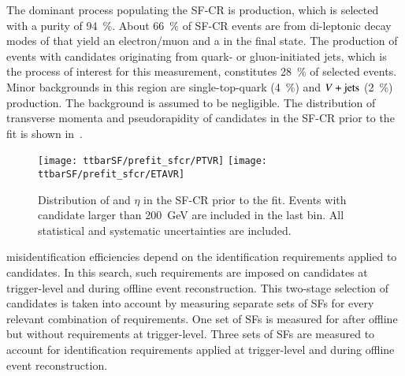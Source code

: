 The dominant process populating the SF-CR is \ttbar production, which is
selected with a purity of \SI{94}{\percent}. About \SI{66}{\percent} of SF-CR
events are from di-leptonic decay modes of \ttbar that yield an electron/muon
and a \tauhadvis in the final state. The production of \ttbar events with
\tauhadvis candidates originating from quark- or gluon-initiated jets, which is
the process of interest for this measurement, constitutes \SI{28}{\percent} of
selected events. Minor backgrounds in this region are single-top-quark
(\SI{4}{\percent}) and $V+\text{jets}$ (\SI{2}{\percent}) production. The \multijet
background is assumed to be negligible. The distribution of transverse momenta
and pseudorapidity of \tauhadvis candidates in the SF-CR prior to the fit is
shown in~.

\begin{figure}[htbp]
  \centering

  \texttt{[image: ttbarSF/prefit\_sfcr/PTVR]}%
  \texttt{[image: ttbarSF/prefit\_sfcr/ETAVR]}

  \caption[Distribution of \tauhadvis \pT and $\eta$ in the SF-CR.]{Distribution
    of \tauhadvis \pT and $\eta$ in the SF-CR prior to the fit. Events with
    \tauhadvis candidate \pT larger than \SI{200}{\GeV} are included in the last
    bin. All statistical and systematic uncertainties are included.}%
  \label{fig:ttbarSF_prefit_pt}
\end{figure}

\Jettotauhadvis misidentification efficiencies depend on the identification
requirements applied to \tauhadvis candidates. In this search, such requirements
are imposed on \tauhadvis candidates at trigger-level and during offline event
reconstruction. This two-stage selection of \tauhadvis candidates is taken into
account by measuring separate sets of SFs for every relevant combination of
\tauid requirements. One set of SFs is measured for \faketauhadvis after offline
\tauid but without requirements at trigger-level.
Three sets of SFs are measured to account for identification requirements
applied at trigger-level and during offline event reconstruction.

